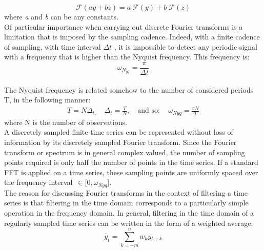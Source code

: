 \documentclass{article}
\begin{document}
\begin{equation}
\mathcal{F}(\textit{a} y + \textit{b} z) = \textit{a} \ \mathcal{F}(y)+ \textit{b} \ \mathcal{F}(z)
\end{equation}
where \textit{a} and \textit{b} can be any constants.\\Of particular importance when carrying out discrete Fourier transforms is a limitation that is imposed by the sampling cadence. Indeed, with a finite cadence of sampling, with time interval $\Delta t$ , it is impossible to detect any periodic signal with a frequency that is higher than the Nyquist frequency. This frequency is:
\begin{equation}
\omega_{N_{yq}} = \frac {\pi}{\Delta t}
\end{equation}\\
{\color{red}The Nyquist frequency is related somehow to the number of considered periods T, in the following manner:
\begin{equation*}
\begin{split}
T=N\Delta_{t,}\quad \Delta_{t}=\frac{T}{N},\quad \text{and so}: \quad \omega_{Nyq}=\frac{\pi N}{T}
\end{split}
\end{equation*}
where N is the number of observations.}\\
A discretely sampled finite time series can be represented without loss of information by its discretely sampled Fourier transform. Since the Fourier transform or spectrum is in general complex valued, the number of sampling points required is only half the number of points in the time series. If a standard FFT is applied on a time series, these sampling points are uniformly spaced over the frequency interval\ $\in [0,\omega_{Nyq}$].\\The reason for discussing Fourier transforms in the context of filtering a time series is that filtering in the time domain corresponds to a particularly simple operation in the frequency domain. In general, filtering in the time domain of a regularly sampled time series can be written in the form of a weighted average:
\begin{equation}
\tilde {y_t} = \sum\limits_{k=-m}^{n} \textit{w$_k$}\textit{y$_{t+k}$}
\end{equation}
\end{document}
